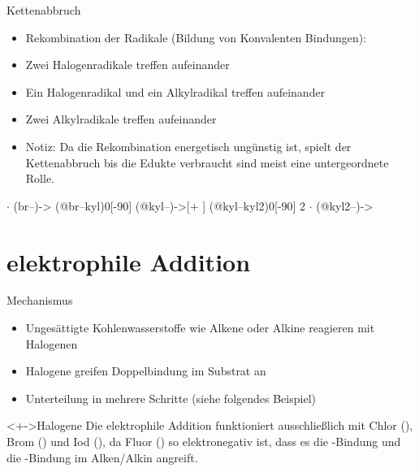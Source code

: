 \begin{block}{Kettenabbruch}
\begin{itemize}
	\item<8-> Rekombination der Radikale (Bildung von Konvalenten Bindungen):
	\item<9-> Zwei Halogenradikale treffen aufeinander
	\item<10-> Ein Halogenradikal und ein Alkylradikal treffen aufeinander
	\item<11-> Zwei Alkylradikale treffen aufeinander
	\item<12-> Notiz: Da die Rekombination energetisch ungünstig ist, spielt der Kettenabbruch bis die Edukte verbraucht sind meist eine untergeordnete Rolle.
\end{itemize}
\end{block}
\begin{examples}
	 $\cdot$ 
		\arrow(br--){->}
		\arrow(@br--kyl){0}[-90]
		\arrow(@kyl--){->[+ ]}
		\arrow(@kyl--kyl2){0}[-90]
		2 $\cdot$ 
		\arrow(@kyl2--){->}
	\schemestop
\end{examples}


\section{elektrophile Addition}

	\begin{block}{Mechanismus}
	\begin{itemize}
		\item<+-> Ungesättigte Kohlenwasserstoffe wie Alkene oder Alkine reagieren mit Halogenen
		\item<+-> Halogene greifen Doppelbindung im Substrat an
		\item<+-> Unterteilung in mehrere Schritte (siehe folgendes Beispiel)
	\end{itemize}
	\end{block}
	\begin{alertblock}<+->{Halogene}
		Die elektrophile Addition funktioniert ausschließlich mit Chlor (), Brom () und Iod (), da Fluor () so elektronegativ ist, dass es die -Bindung und die -Bindung im Alken/Alkin angreift.
	\end{alertblock}


